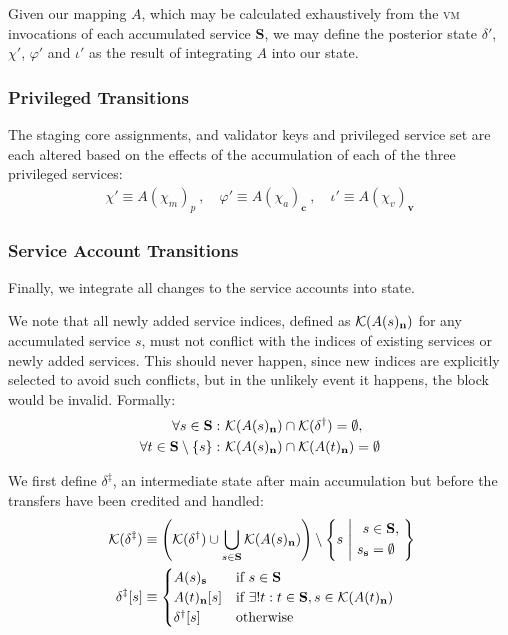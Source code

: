 Given our mapping $A$, which may be calculated exhaustively from the \textsc{vm} invocations of each accumulated service $\mathbf{S}$, we may define the posterior state $\delta'$, $\chi'$, $\varphi'$ and $\iota'$ as the result of integrating $A$ into our state.

\subsubsection{Privileged Transitions}
The staging core assignments, and validator keys and privileged service set are each altered based on the effects of the accumulation of each of the three privileged services:
\begin{align}
  \chi' \equiv A(\chi_m)_p \ ,\quad
  \varphi' \equiv A(\chi_a)_\mathbf{c} \ ,\quad
  \iota' \equiv A(\chi_v)_\mathbf{v}
\end{align}

\subsubsection{Service Account Transitions}
Finally, we integrate all changes to the service accounts into state.

We note that all newly added service indices, defined as $\mathcal{K}(A(s)_\mathbf{n})$ for any accumulated service $s$, must not conflict with the indices of existing services or newly added services. This should never happen, since new indices are explicitly selected to avoid such conflicts, but in the unlikely event it happens, the block would be invalid. Formally:
\begin{equation}
  \begin{aligned}
  \forall s \in \mathbf{S} :\ &\keys{A(s)_\mathbf{n}} \cap \keys{\delta^\dagger} = \none, \\
  \forall t \in \mathbf{S} \setminus \{s\} :\ &\keys{A(s)_\mathbf{n}} \cap \keys{A(t)_\mathbf{n}} = \none
\end{aligned}
\end{equation}

We first define $\delta^\ddagger$, an intermediate state after main accumulation but before the transfers have been credited and handled:
\begin{equation}\begin{aligned}
  \keys{\delta^\ddagger} &\equiv \left ( \keys{\delta^\dagger} \cup \bigcup_{s \in \mathbf{S}} \keys{A(s)_\mathbf{n}} \right ) \setminus \left\{s\ \middle\vert\ \begin{aligned}s &\in \mathbf{S},\\s_\mathbf{s} &= \none\end{aligned}\ \right\}\!\!\\
  \delta^\ddagger[s] &\equiv \begin{cases}
    A(s)_\mathbf{s} &\when s \in \mathbf{S}\\
    A(t)_\mathbf{n}[s] &\when \exists! t : t \in \mathbf{S}, s \in \keys{A(t)_\mathbf{n}} \\
    \delta^\dagger[s] &\otherwise
  \end{cases}
\end{aligned}\end{equation}


